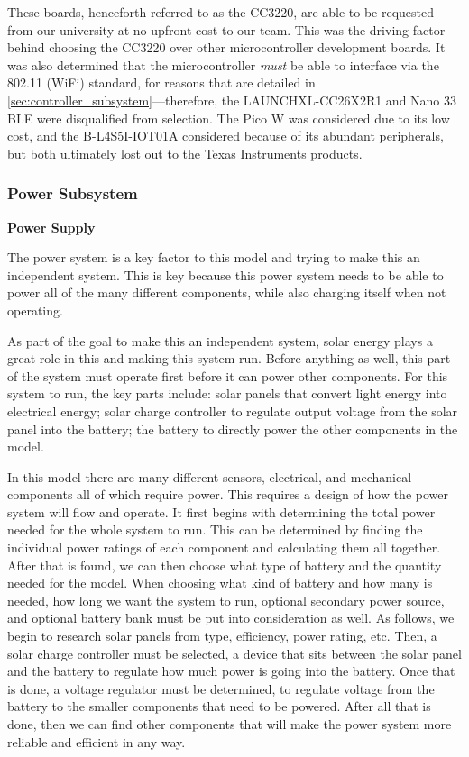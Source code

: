 These boards, henceforth referred to as the CC3220, are able to be requested from our
university at no upfront cost to our team. This was the driving factor behind choosing 
the CC3220 over other microcontroller development boards. It was also determined that
the microcontroller \emph{must} be able to interface via the 802.11 (WiFi) standard, for reasons
that are detailed in \autoref{sec:controller_subsystem}---therefore, the LAUNCHXL-CC26X2R1
and Nano 33 BLE were disqualified from selection. The Pico W was considered due to its low cost,
and the B-L4S5I-IOT01A considered because of its abundant peripherals, but both ultimately lost
out to the Texas Instruments products.

\subsubsection{Power Subsystem}
\textbf{Power Supply}\par
The power system is a key factor to this model and trying to make this an independent system. This is key because this power system needs to be able to power all of the many different components, while also charging itself when not operating.\par
As part of the goal to make this an independent system, solar energy plays a great role in this and making this system run. Before anything as well, this part of the system must operate first before it can power other components. For this system to run, the key parts include: solar panels that convert light energy into electrical energy; solar charge controller to regulate output voltage from the solar panel into the battery; the battery to directly power the other components in the model.\par
In this model there are many different sensors, electrical, and mechanical components all of which require power. This requires a design of how the power system will flow and operate. It first begins with determining the total power needed for the whole system to run. This can be determined by finding the individual power ratings of each component and calculating them all together. After that is found, we can then choose what type of battery and the quantity needed for the model. When choosing what kind of battery and how many is needed, how long we want the system to run, optional secondary power source, and optional battery bank must be put into consideration as well. As follows, we begin to research solar panels from type, efficiency, power rating, etc. Then, a solar charge controller must be selected, a device that sits between the solar panel and the battery to regulate how much power is going into the battery. Once that is done, a voltage regulator must be determined, to regulate voltage from the battery to the smaller components that need to be powered. After all that is done, then we can find other components that will make the power system more reliable and efficient in any way.\par
